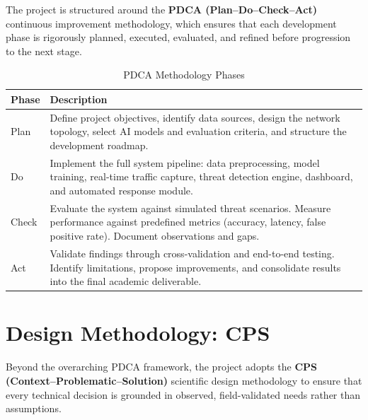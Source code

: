 \documentclass[12pt,a4paper]{report}
\begin{document}
The project is structured around the \textbf{PDCA (Plan--Do--Check--Act)} continuous
improvement methodology, which ensures that each development phase is rigorously planned,
executed, evaluated, and refined before progression to the next stage.

\begin{table}[h!]
\centering
\caption{PDCA Methodology Phases}
\begin{tabular}{@{}B{2cm} L{12cm}@{}}
  \toprule
  \textbf{Phase} & \textbf{Description} \\
  \midrule
  Plan  & Define project objectives, identify data sources, design the network topology,
          select AI models and evaluation criteria, and structure the development roadmap. \\
  \addlinespace
  Do    & Implement the full system pipeline: data preprocessing, model training, real-time
          traffic capture, threat detection engine, dashboard, and automated response module. \\
  \addlinespace
  Check & Evaluate the system against simulated threat scenarios. Measure performance
          against predefined metrics (accuracy, latency, false positive rate). Document
          observations and gaps. \\
  \addlinespace
  Act   & Validate findings through cross-validation and end-to-end testing. Identify
          limitations, propose improvements, and consolidate results into the final academic
          deliverable. \\
  \bottomrule
\end{tabular}
\label{tab:pdca}
\end{table}

\chapter{Design Methodology: CPS}

Beyond the overarching PDCA framework, the project adopts the
\textbf{CPS (Context--Problematic--Solution)} scientific design methodology to ensure that
every technical decision is grounded in observed, field-validated needs rather than
assumptions.
\end{document}
